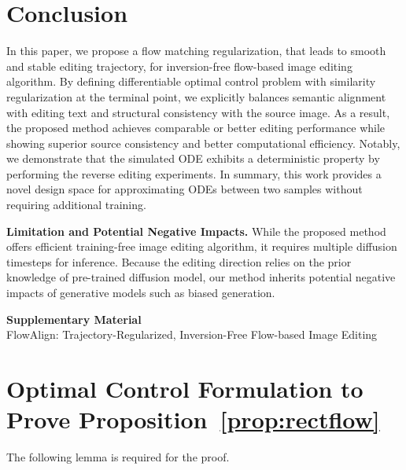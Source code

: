 \section{Conclusion}
In this paper, we propose a flow matching regularization, that leads to smooth and stable editing trajectory, for inversion-free flow-based image editing algorithm. By defining differentiable optimal control problem with similarity regularization at the terminal point, we explicitly balances semantic alignment with editing text and structural consistency with the source image. 
As a result, the proposed method achieves comparable or better editing performance while showing superior source consistency and better computational efficiency.
Notably, we demonstrate that the simulated ODE exhibits a deterministic property by performing the reverse editing experiments.
In summary, this work provides a novel design space for approximating ODEs between two samples without requiring additional training.

\noindent\textbf{Limitation and Potential Negative Impacts.}
While the proposed method offers efficient training-free image editing algorithm, it requires multiple diffusion timesteps for inference. 
Because the editing direction relies on the prior knowledge of pre-trained diffusion model, our method inherits potential negative impacts of generative models such as biased generation.

\clearpage

\clearpage
\appendix

\begin{center}
  {\LARGE \bfseries Supplementary Material}\\[0.5em]
  {\large FlowAlign: Trajectory-Regularized,  Inversion-Free Flow-based Image Editing}
\end{center}
\vspace{1em}

\section{Optimal Control Formulation to Prove Proposition~\ref{prop:rectflow}}

The following lemma is required for the proof.

